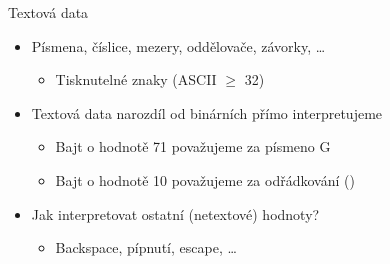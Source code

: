 \begin{frame}{Textová data}

  \begin{itemize}
    \item Písmena, číslice, mezery, oddělovače, závorky, \dots
    \begin{itemize}
      \item Tisknutelné znaky (ASCII $\geq$ 32)
    \end{itemize}

    \pause

    \item Textová data narozdíl od binárních přímo interpretujeme
    \begin{itemize}
      \item Bajt o hodnotě 71 považujeme za písmeno G
      \item Bajt o hodnotě 10 považujeme za odřádkování (\code{\\n})
    \end{itemize}

    \pause

    \item Jak interpretovat ostatní (netextové) hodnoty?
    \begin{itemize}
      \item Backspace, pípnutí, escape, \dots
    \end{itemize}

  \end{itemize}

\end{frame}

